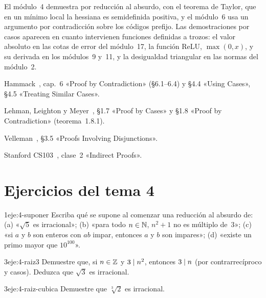\begin{observacion}
El módulo~4 demuestra por reducción al absurdo, con el teorema de Taylor, que en un mínimo local la hessiana es semidefinida positiva, y el módulo~6 usa un argumento por contradicción sobre los códigos prefijo. Las demostraciones por casos aparecen en cuanto intervienen funciones definidas a trozos: el valor absoluto en las cotas de error del módulo~17, la función ReLU, $\max(0,x)$, y su derivada en los módulos~9 y~11, y la desigualdad triangular en las normas del módulo~2.
\end{observacion}

\begin{lecturas}
\item Hammack~\cite{hammack}, cap.~6 «Proof by Contradiction» (§6.1–6.4) y §4.4 «Using Cases», §4.5 «Treating Similar Cases».
\item Lehman, Leighton y Meyer~\cite{mcs}, §1.7 «Proof by Cases» y §1.8 «Proof by Contradiction» (teorema~1.8.1).
\item Velleman~\cite{velleman}, §3.5 «Proofs Involving Disjunctions».
\item Stanford CS103~\cite{cs103}, clase~2 «Indirect Proofs».
\end{lecturas}

\section*{Ejercicios del tema 4}

\begin{ejercicio}{1}{eje:4-suponer}
Escriba qué se supone al comenzar una reducción al absurdo de: (a) «$\sqrt5$ es irracional»; (b) «para todo $n\in\mathbb{N}$, $n^{2}+1$ no es múltiplo de~3»; (c) «si $a$ y $b$ son enteros con $ab$ impar, entonces $a$ y $b$ son impares»; (d) «existe un primo mayor que $10^{100}$».
\end{ejercicio}

\begin{ejercicio}{3}{eje:4-raiz3}
Demuestre que, si $n\in\mathbb{Z}$ y $3\mid n^{2}$, entonces $3\mid n$ (por contrarrecíproco y casos). Deduzca que $\sqrt3$ es irracional.
\end{ejercicio}

\begin{ejercicio}{3}{eje:4-raiz-cubica}
Demuestre que $\sqrt[3]{2}$ es irracional.
\end{ejercicio}


